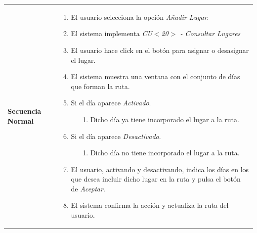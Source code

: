 \begin{longtable}{| p{4cm} | p{10cm} |}
\hline
\textbf{Secuencia Normal} &\mbox{}\par\vspace{-\baselineskip}
\begin{enumerate}[leftmargin=0.7cm, topsep=0.1cm]
\item El usuario selecciona la opción \textit{Añadir Lugar}.
\item El sistema implementa \textit{CU$<$20$>$ - Consultar Lugares}
\item El usuario hace click en el botón para asignar o desasignar el lugar.
\item El sistema muestra una ventana con el conjunto de días que forman la ruta.
\item Si el día aparece \textit{Activado}.
	\begin{itemize}
	\item[1.] Dicho día ya tiene incorporado el lugar a la ruta.
	\end{itemize}
\item Si el día aparece \textit{Desactivado}.
	\begin{itemize}
	\item[1.] Dicho día no tiene incorporado el lugar a la ruta.
	\end{itemize}
\item El usuario, activando y desactivando, indica los días en los que desea incluir dicho lugar en la ruta y pulsa el botón de \textit{Aceptar}.
\item El sistema confirma la acción y actualiza la ruta del usuario.

\end{enumerate}



\end{longtable}

